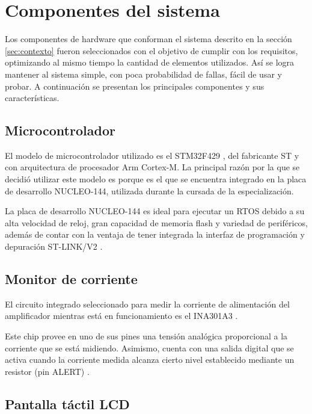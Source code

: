 \section{Componentes del sistema}

Los componentes de hardware que conforman el sistema descrito en la sección \ref{sec:contexto} fueron seleccionados con el objetivo de cumplir con los requisitos, optimizando al mismo tiempo la cantidad de elementos utilizados. Así se logra mantener al sistema simple, con poca probabilidad de fallas, fácil de usar y probar. A continuación se presentan los principales componentes y sus características.

\subsection{Microcontrolador}

El modelo de microcontrolador utilizado es el STM32F429 \citep{STM32F429}, del fabricante ST y con arquitectura de procesador Arm Cortex-M. La principal razón por la que se decidió utilizar este modelo es porque es el que se encuentra integrado en la placa de desarrollo NUCLEO-144, utilizada durante la cursada de la especialización.

La placa de desarrollo NUCLEO-144 es ideal para ejecutar un RTOS debido a su alta velocidad de reloj, gran capacidad de memoria flash y variedad de periféricos, además de contar con la ventaja de tener integrada la interfaz de programación y depuración ST-LINK/V2 \citep{NUCLEO144}.

\subsection{Monitor de corriente}

El circuito integrado seleccionado para medir la corriente de alimentación del amplificador mientras está en funcionamiento es el INA301A3 \citep{INA301}.

Este chip provee en uno de sus pines una tensión analógica proporcional a la corriente que se está midiendo. Asimismo, cuenta con una salida digital que se activa cuando la corriente medida alcanza cierto nivel establecido mediante un resistor (pin ALERT) \citep{INA301}.

\subsection{Pantalla táctil LCD}
\label{sec:pantLCD}

